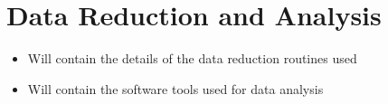\section{Data Reduction and Analysis}
    \begin{itemize}
        \item Will contain the details of the data reduction routines used
        \item Will contain the software tools used for data analysis
    \end{itemize}

